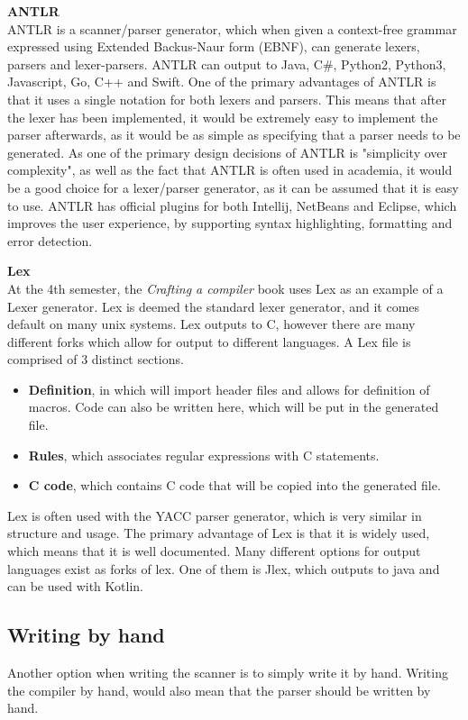 \textbf{ANTLR}\\
ANTLR is a scanner/parser generator, which when given a context-free grammar expressed using Extended Backus-Naur form (EBNF), can generate lexers, parsers and lexer-parsers\cite{ANTLR}.
ANTLR can output to Java, C\#, Python2, Python3, Javascript, Go, C++ and Swift\cite{ANTLRDocsTargets}.
One of the primary advantages of ANTLR is that it uses a single notation for both lexers and parsers\cite{ANTLRDocs}.
This means that after the lexer has been implemented, it would be extremely easy to implement the parser afterwards, as it would be as simple as specifying that a parser needs to be generated.
As one of the primary design decisions of ANTLR is "simplicity over complexity", as well as the fact that ANTLR is often used in academia, it would be a good choice for a lexer/parser generator, as it can be assumed that it is easy to use.
ANTLR has official plugins for both Intellij, NetBeans and Eclipse, which improves the user experience, by supporting syntax highlighting, formatting and error detection.

\textbf{Lex}\\
At the 4th semester, the \textit{Crafting a compiler} book uses Lex as an example of a Lexer generator\cite{CraftingACompiler}.
Lex is deemed the standard lexer generator, and it comes default on many unix systems.
Lex outputs to C, however there are many different forks which allow for output to different languages.
A Lex file is comprised of 3 distinct sections\cite{Lex}.
\begin{itemize}
	\item \textbf{Definition}, in which will import header files and allows for definition of macros. 
	Code can also be written here, which will be put in the generated file.
	\item \textbf{Rules}, which associates regular expressions with C statements.
	\item \textbf{C code}, which contains C code that will be copied into the generated file.
\end{itemize}
Lex is often used with the YACC parser generator, which is very similar in structure and usage.
The primary advantage of Lex is that it is widely used, which means that it is well documented.
Many different options for output languages exist as forks of lex.
One of them is Jlex\cite{JLex}, which outputs to java and can be used with Kotlin.

\subsection{Writing by hand}
Another option when writing the scanner is to simply write it by hand.
Writing the compiler by hand, would also mean that the parser should be written by hand.

